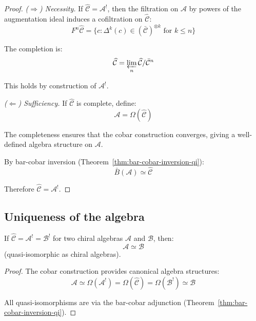 \begin{proof}
\emph{($\Rightarrow$) Necessity.}
If $\widehat{\mathcal{C}} = \mathcal{A}^!$, then the filtration on $\mathcal{A}$ by 
powers of the augmentation ideal induces a cofiltration on $\widehat{\mathcal{C}}$:
\[F^n\widehat{\mathcal{C}} = \{c : \Delta^k(c) \in (\bar{\mathcal{C}})^{\otimes k} 
\text{ for } k \leq n\}\]

The completion is:
\[\widehat{\mathcal{C}} = \varprojlim_n \widehat{\mathcal{C}} / \bar{\mathcal{C}}^n\]

This holds by construction of $\mathcal{A}^!$.

\emph{($\Leftarrow$) Sufficiency.}
If $\widehat{\mathcal{C}}$ is complete, define:
\[\mathcal{A} = \Omega(\widehat{\mathcal{C}})\]

The completeness ensures that the cobar construction converges, giving a well-defined 
algebra structure on $\mathcal{A}$.

By bar-cobar inversion (Theorem~\ref{thm:bar-cobar-inversion-qi}):
\[\bar{B}(\mathcal{A}) \simeq \widehat{\mathcal{C}}\]

Therefore $\widehat{\mathcal{C}} = \mathcal{A}^!$.
\end{proof}

\subsection{Uniqueness of the algebra}

\begin{theorem}\label{thm:uniqueness-algebra}
If $\widehat{\mathcal{C}} = \mathcal{A}^! = \mathcal{B}^!$ for two chiral algebras 
$\mathcal{A}$ and $\mathcal{B}$, then:
\[\mathcal{A} \simeq \mathcal{B}\]
(quasi-isomorphic as chiral algebras).
\end{theorem}

\begin{proof}
The cobar construction provides canonical algebra structures:
\[\mathcal{A} \simeq \Omega(\mathcal{A}^!) = \Omega(\widehat{\mathcal{C}}) = 
\Omega(\mathcal{B}^!) \simeq \mathcal{B}\]

All quasi-isomorphisms are via the bar-cobar adjunction (Theorem~\ref{thm:bar-cobar-inversion-qi}).
\end{proof}

